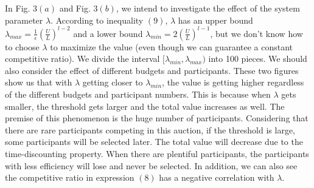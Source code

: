 \documentclass[conference,compsocconf,letterpaper,10pt]{IEEEtran}
\begin{document}
In Fig. $3(a)$ and Fig. $3(b)$, we intend to investigate the effect of the system parameter $\lambda$. According to inequality $(9)$, $\lambda$ has an upper bound $\lambda_{max}= \frac{1}{\epsilon}\left(\frac{U}{L}\right)^{l-2}$ and a lower bound $\lambda_{min}=2\left(\frac{U}{L}\right)^{l-1}$, but we don't know how to choose $\lambda$ to maximize the value (even though we can  guarantee a constant competitive ratio). We divide the interval $[\lambda_{min}, \lambda_{max})$ into 100 pieces. We should also consider the effect of different budgets and participants. These two figures show us that with  $\lambda$ getting closer to $\lambda_{min}$, the value is getting higher regardless of the different budgets and participant numbers. This is because when $\lambda$ gets smaller, the threshold gets larger and the total value increases as well. The premise of this phenomenon is the huge number of participants. Considering that there are rare participants competing in this auction, if the threshold is large, some participants will be selected later. The total value will decrease due to the time-discounting property. When there are plentiful participants, the participants with less efficiency will lose and never be selected. In addition, we can also see the competitive ratio in expression $(8)$ has a negative correlation with $\lambda$.
\end{document}
